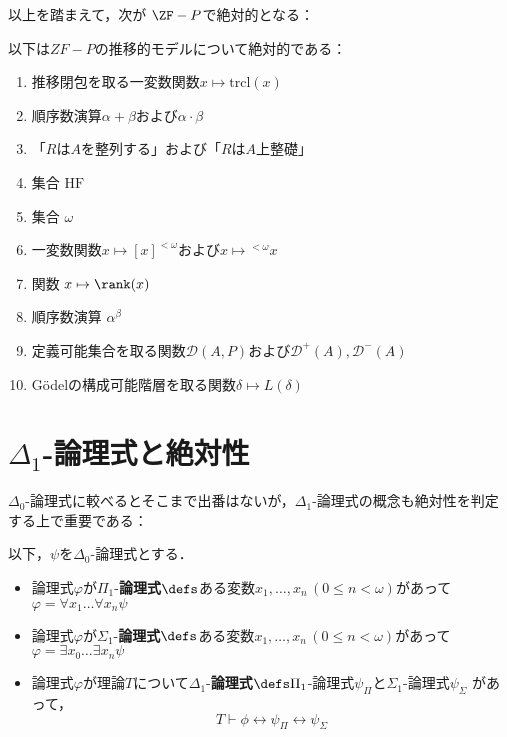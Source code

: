 \documentclass[xelatex,a4j,jadriver=standard]{bxjsarticle}
\newcommand*{\HF}{\mathrm{HF}}
\begin{document}
以上を踏まえて，次が $\ZF-P$で絶対的となる：

\begin{theorem}[$ZF-P$で絶対的]
 以下は$ZF-P$の推移的モデルについて絶対的である：
 \begin{enumerate}
  \item 推移閉包を取る一変数関数$x \mapsto \mathrm{trcl}(x)$
  \item 順序数演算$\alpha + \beta$および$\alpha \cdot \beta$
  \item 「$R$は$A$を整列する」および「$R$は$A$上整礎」
  \item 集合 $\HF$
  \item 集合 $\omega$
  \item 一変数関数$x \mapsto [x]^{<\omega}$および$x \mapsto {}^{<\omega} x$
  \item 関数 $x \mapsto \rank(x)$
  \item 順序数演算 $\alpha^\beta$
  \item 定義可能集合を取る関数$\mathcal{D}(A, P)$および$\mathcal{D}^+(A), \mathcal{D}^-(A)$
  \item G\"{o}delの構成可能階層を取る関数$\delta \mapsto L(\delta)$
 \end{enumerate}
\end{theorem}

\section{$\Delta_1$-論理式と絶対性}
$\Delta_0$-論理式に較べるとそこまで出番はないが，$\Delta_1$-論理式の概念も絶対性を判定する上で重要である：

\begin{definition}
 以下，$\psi$を$\Delta_0$-論理式とする．
 
 \begin{itemize}
  \item 論理式$\varphi$が$\Pi_1$-{\bfseries 論理式}$\defs$ある変数$x_1, \dots, x_n\,(0 \leq n < \omega)$があって$\varphi = \forall x_1 \dots \forall x_n \psi$
  \item 論理式$\varphi$が$\Sigma_1$-{\bfseries 論理式}$\defs$ある変数$x_1, \dots, x_n\,(0 \leq n < \omega)$があって$\varphi = \exists x_0 \dots \exists x_n \psi$
  \item 論理式$\varphi$が理論$T$について$\Delta_1$-{\bfseries 論理式}$\defs \Pi_1$-論理式$\psi_\Pi$と$\Sigma_1$-論理式$\psi_\Sigma$ があって，
	\[
	 T \vdash \phi \leftrightarrow \psi_\Pi \leftrightarrow \psi_\Sigma
	\]
 \end{itemize}
\end{definition}
\end{document}
